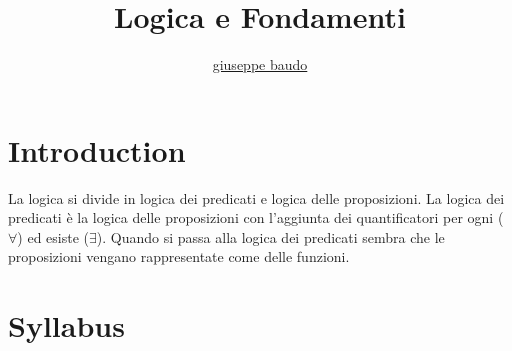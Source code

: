 \documentclass[a4paper,10pt]{article}
\title{Logica e Fondamenti}
\author{\href{http://www.baudo.hol.es}{giuseppe baudo}}
\begin{document}
\maketitle

\section{Introduction}
La logica si divide in logica dei predicati e logica delle proposizioni. La logica dei predicati è la logica delle proposizioni con l'aggiunta dei quantificatori
per ogni ($\forall$) ed esiste ($\exists$). Quando si passa alla logica dei predicati sembra che le proposizioni vengano rappresentate come delle funzioni. 

\section{Syllabus}
\end{document}
